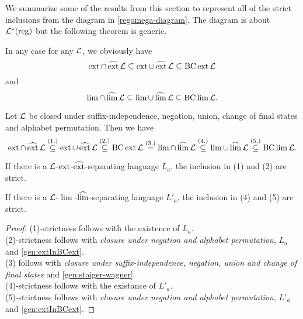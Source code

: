 
We summarize some of the results from this section to represent all of the strict inclusions from the diagram in \cref{regomega-diagram}. The diagram is about $\mathcal{L}^*(\textup{\textrm{reg}})$ but the following theorem is generic.

In any case for any $\mathcal{L}$, we obviously have
\[ \operatorname{ext} \cap \operatorname{\widehat{ext}} \mathcal{L} \subseteq
\operatorname{ext} \cup \operatorname{\widehat{ext}} \mathcal{L} \subseteq
\operatorname{BC} \operatorname{ext} \mathcal{L} \]
and
\[ \lim \cap \operatorname{\widehat{lim}} \mathcal{L} \subseteq
\lim \cup \operatorname{\widehat{lim}} \mathcal{L} \subseteq
\operatorname{BC} \lim \mathcal{L} . \]

\begin{samepage}
\begin{mdframed}
\begin{theorem}
\label{gen:main-theorem-inclusions}
Let $\mathcal{L}$ be closed under suffix-independence, negation, union, change of final states and alphabet permutation.
Then we have
\[ \operatorname{ext} \cap \operatorname{\widehat{ext}} \mathcal{L} \stackrel{(1.)}\subseteq
\operatorname{ext} \cup \operatorname{\widehat{ext}} \mathcal{L} \stackrel{(2.)}\subseteq
\operatorname{BC} \operatorname{ext} \mathcal{L} \stackrel{(3.)}=
\lim \cap \operatorname{\widehat{lim}} \mathcal{L} \stackrel{(4.)}\subseteq
\lim \cup \operatorname{\widehat{lim}} \mathcal{L} \stackrel{(5.)}\subseteq
\operatorname{BC} \lim \mathcal{L} . \]

If there is a $\mathcal{L}$-$\operatorname{ext}$-$\operatorname{\widehat{ext}}$-separating language $L_a$, the inclusion in (1) and (2) are strict.

If there is a $\mathcal{L}$-$\lim$-$\operatorname{\widehat{lim}}$-separating language $L'_a$, the inclusion in (4) and (5) are strict.
\end{theorem}
\end{mdframed}
\end{samepage}

\begin{proof}
(1)-strictness follows with the existence of $L_a$. \\
(2)-strictness follows with \emph{closure under negation and alphabet permutation}, $L_a$ and \cref{gen:extInBCext}. \\
(3) follows with \emph{closure under suffix-independence, negation, union and change of final states} and \cref{gen:staiger-wagner}. \\
(4)-strictness follows with the existance of $L'_a$. \\
(5)-strictness follows with \emph{closure under negation and alphabet permutation}, $L'_a$ and \cref{gen:extInBCext}.
\end{proof}

